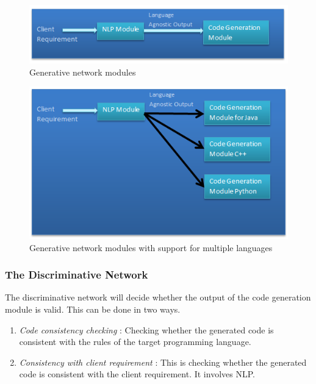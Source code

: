 \documentclass[conference, onecolumn, a4, 12pt]{IEEEtran}
\begin{document}
\begin{figure}
	\includegraphics[width=\linewidth]{Gen_net_modules.png}
	\caption{Generative network modules}
	\label{fig7}
\end{figure} 

\begin{figure}
	\includegraphics[width=\linewidth]{Gen_net_modules_multiple.png}
	\caption{Generative network modules with support for multiple languages}
	\label{fig8}
\end{figure} 

\subsubsection{The Discriminative Network}

The discriminative network will decide whether the output of the code generation module is valid. This can be done in two ways.

\begin{enumerate}
	\item\textit{Code consistency checking} : Checking whether the generated code is consistent with the rules of the target programming language.
	\item\textit{Consistency with client requirement} : This is checking whether the generated code is consistent with the client requirement. It involves NLP. 	
\end{enumerate}
\end{document}
